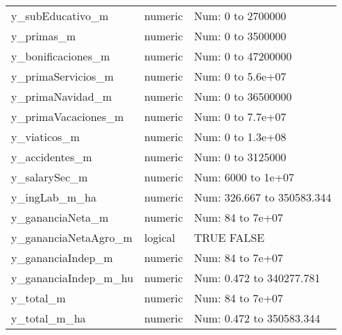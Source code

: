 \begin{table}[!htbp]
\begin{tabular}{p{}p{}p{}}
y\_subEducativo\_m & numeric & Num: 0 to 2700000 \\ 
y\_primas\_m & numeric & Num: 0 to 3500000 \\ 
y\_bonificaciones\_m & numeric & Num: 0 to 47200000 \\ 
y\_primaServicios\_m & numeric & Num: 0 to 5.6e+07 \\ 
y\_primaNavidad\_m & numeric & Num: 0 to 36500000 \\ 
y\_primaVacaciones\_m & numeric & Num: 0 to 7.7e+07 \\ 
y\_viaticos\_m & numeric & Num: 0 to 1.3e+08 \\ 
y\_accidentes\_m & numeric & Num: 0 to 3125000 \\ 
y\_salarySec\_m & numeric & Num: 6000 to 1e+07 \\ 
y\_ingLab\_m\_ha & numeric & Num: 326.667 to 350583.344 \\ 
y\_gananciaNeta\_m & numeric & Num: 84 to 7e+07 \\ 
y\_gananciaNetaAgro\_m & logical & TRUE FALSE \\ 
y\_gananciaIndep\_m & numeric & Num: 84 to 7e+07 \\ 
y\_gananciaIndep\_m\_hu & numeric & Num: 0.472 to 340277.781 \\ 
y\_total\_m & numeric & Num: 84 to 7e+07 \\ 
y\_total\_m\_ha & numeric & Num: 0.472 to 350583.344\\ 
\hline
\hline
\end{tabular}
\end{table}

